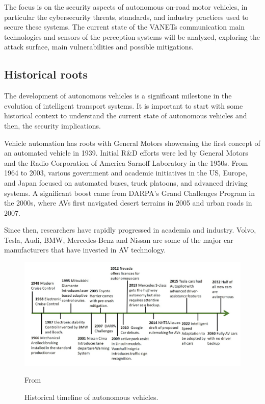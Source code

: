 The focus is on the security aspects of autonomous on-road motor vehicles,
in particular the cybersecurity threats, standards, and industry practices used to secure these systems.
The current state of the VANETs communication main technologies and sensors of the perception systems will be analyzed,
exploring the attack surface, main vulnerabilities and possible mitigations.

\subsection{Historical roots}\label{subsec:historical-roots}

The development of autonomous vehicles is a significant milestone in the evolution of intelligent transport systems.
It is important to start with some historical context to understand the current state of autonomous vehicles and then,
the security implications.

Vehicle automation has roots with General Motors showcasing the first concept of an automated vehicle in 1939.
Initial R\&D efforts were led by General Motors and the Radio Corporation of America Sarnoff Laboratory in the 1950s.
From 1964 to 2003, various government and academic initiatives in the US, Europe,
and Japan focused on automated buses, truck platoons, and advanced driving systems\cite{pendleton2017perception, shladover2017connected}.
A significant boost came from DARPA’s Grand Challenges Program in the 2000s\cite{darpa_grand_challenges_book},
where AVs first navigated desert terrains in 2005 and urban roads in 2007\cite{pendleton2017perception, shladover2017connected}.

Since then, researchers have rapidly progressed in academia and industry.
Volvo, Tesla, Audi, BMW,
Mercedes-Benz and Nissan are some of the major car manufacturers that have invested in AV technology\cite{faisal2019understanding}.

\begin{figure}[!htb]
    \centering
    \includegraphics[width=0.7\linewidth]{figures/history}
    \caption{Historical timeline of autonomous vehicles.}
    \footnotesize{From \cite{ahangar2021survey} }
    \label{fig:history}
\end{figure}

